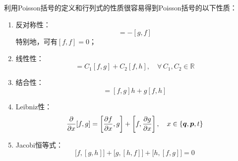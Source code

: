 利用Poisson括号的定义和行列式的性质很容易得到Poisson括号的以下性质：
\begin{enumerate}
	\item 反对称性：
	\begin{equation}
		[f,g] = -[g,f]
		\label{chapter9:Poisson括号的反对称性}
	\end{equation}
	特别地，可有$[f,f] = 0$；
	\item 线性性：
	\begin{equation}
		[f,C_1 g+C_2 h] = C_1[f,g] + C_2[f,h],\quad \forall \, C_1,C_2 \in \mathbb{R}
		\label{chapter9:Poisson括号的线性性}
	\end{equation}
	\item 结合性：
	\begin{equation}
		[f,gh] = [f,g]h+g[f,h]
		\label{chapter9:Poisson括号的结合性}
	\end{equation}
	\item Leibniz性：
	\begin{equation}
		\frac{\partial}{\partial x} [f,g] = \left[\frac{\partial f}{\partial x},g\right] + \left[f,\frac{\partial g}{\partial x}\right],\quad x \in \{\boldsymbol{q},\boldsymbol{p},t\}
		\label{chapter9:Poisson括号的Leibniz性}
	\end{equation}
	\item Jacobi恒等式：
	\begin{equation}
		\big[f,[g,h]\big] + \big[g,[h,f]\big] + \big[h,[f,g]\big] = 0
		\label{chapter9:Poisson括号的Jacobi恒等式}
	\end{equation}
\end{enumerate}

